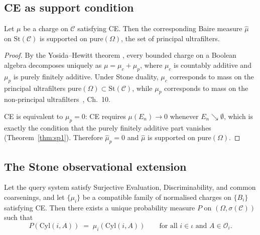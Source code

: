 \subsection{CE as support condition}
\label{sec:B2}

\begin{proposition}
\label{prop:B2}
Let $\mu$ be a charge on $\mathcal{C}$ satisfying CE.  Then the corresponding Baire measure $\hat{\mu}$ on $\mathrm{St}(\mathcal{C})$ is supported on $\mathrm{pure}(\Omega)$, the set of principal ultrafilters.
\end{proposition}

\begin{proof}
By the Yosida--Hewitt theorem \cite{YosidaHewitt1952, rao1983}, every bounded charge on a Boolean algebra decomposes uniquely as $\mu = \mu_c + \mu_p$, where $\mu_c$ is countably additive and $\mu_p$ is purely finitely additive.  Under Stone duality, $\mu_c$ corresponds to mass on the principal ultrafilters $\mathrm{pure}(\Omega) \subset \mathrm{St}(\mathcal{C})$, while $\mu_p$ corresponds to mass on the non-principal ultrafilters~\cite{rao1983}, Ch.~10.

CE is equivalent to $\mu_p = 0$: CE requires $\mu(E_n) \to 0$ whenever $E_n \searrow \emptyset$, which is exactly the condition that the purely finitely additive part vanishes (Theorem~\ref{thm:sp1}).  Therefore $\hat{\mu}_p = 0$ and $\hat{\mu}$ is supported on $\mathrm{pure}(\Omega)$.
\end{proof}

\subsection{The Stone observational extension}
\label{sec:assembly}

\begin{theorem}
\label{thm:stone-main}
Let the query system satisfy Surjective Evaluation, Discriminability, and common coarsenings, and let $\{\mu_i\}$ be a compatible family of normalised charges on $\{B_i\}$ satisfying CE.  Then there exists a unique probability measure $P$ on $(\Omega, \sigma(\mathcal{C}))$ such that
\[
  P(\mathrm{Cyl}(i, A))
  \;=\; \mu_i(\mathrm{Cyl}(i, A))
  \qquad \text{for all } i \in \iota \text{ and } A \in \mathcal{O}_i.
\]
\end{theorem}

